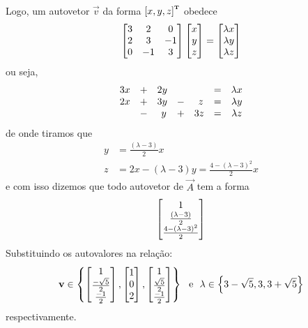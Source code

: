 \documentclass{homework}
\begin{document}
		Logo, um autovetor $\vec{v}$ da forma $\left[x, y, z\right]^{\text{\bfseries\tiny T}}$ obedece
			\begin{align*}
				\left[\begin{array}{@{}ccc@{}}
				3 &  2 &  0 \\
				2 &  3 & -1 \\
				0 & -1 &  3
				\end{array}\right] \left[\begin{array}{@{}c@{}}
				x \\
				y \\
				z 
				\end{array}\right] = \left[\begin{array}{@{}c@{}}
				\lambda x \\
				\lambda y \\
				\lambda z 
				\end{array}\right]
			\end{align*}
		ou seja,
			\begin{align*}
			\begin{array}{@{}ccccccc@{}}
			3x&+&2y&~&~~&=&\lambda x\\
			2x&+&3y&-&~z&=&\lambda y\\
			~~&-&~y&+&3z&=&\lambda z
			\end{array}
			\end{align*}
		de onde tiramos que
			\begin{align*}
				y &= \frac{(\lambda - 3)}{2} x\\
				z &= 2x -(\lambda - 3) y = \frac{4 - (\lambda - 3)^2}{2} x
			\end{align*}
		e com isso dizemos que todo autovetor de $\vec{A}$ tem a forma
			\begin{align*}
				\left[\begin{array}{@{}c@{}}
				1 \\
				\frac{(\lambda - 3)}{2} \\
				\frac{4 - (\lambda - 3)^2}{2}
				\end{array}\right]
			\end{align*}
		Substituindo os autovalores na relação:
			\begin{align*}
			\vec{v} \in \left\{\left[\begin{array}{@{}c@{}}
			1 \\
			\frac{-\sqrt{5}}{2} \\
			\frac{-1}{2}
			\end{array}\right],
			\left[\begin{array}{@{}c@{}}
			1 \\
			0 \\
			2
			\end{array}\right],
			\left[\begin{array}{@{}c@{}}
			1 \\
			\frac{\sqrt{5}}{2} \\
			\frac{-1}{2}
			\end{array}\right]
			\right\}~\text{ e }~
			\lambda \in \left\{3 - \sqrt{5}, 3, 3 + \sqrt{5}\right\}
			\end{align*}
		respectivamente.
		
\end{document}
